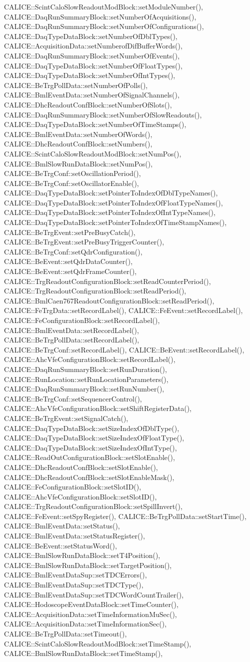 CALICE::ScintCaloSlowReadoutModBlock::setModuleNumber(), CALICE::DaqRunSummaryBlock::setNumberOfAcquisitions(), CALICE::DaqRunSummaryBlock::setNumberOfConfigurations(), CALICE::DaqTypeDataBlock::setNumberOfDblTypes(), CALICE::AcquisitionData::setNumberofDifBufferWords(), CALICE::DaqRunSummaryBlock::setNumberOfEvents(), CALICE::DaqTypeDataBlock::setNumberOfFloatTypes(), CALICE::DaqTypeDataBlock::setNumberOfIntTypes(), CALICE::BeTrgPollData::setNumberOfPolls(), CALICE::BmlEventData::setNumberOfSignalChannels(), CALICE::DhcReadoutConfBlock::setNumberOfSlots(), CALICE::DaqRunSummaryBlock::setNumberOfSlowReadouts(), CALICE::DaqTypeDataBlock::setNumberOfTimeStamps(), CALICE::BmlEventData::setNumberOfWords(), CALICE::DhcReadoutConfBlock::setNumbers(), CALICE::ScintCaloSlowReadoutModBlock::setNumPos(), CALICE::BmlSlowRunDataBlock::setNumPos(), CALICE::BeTrgConf::setOscillationPeriod(), CALICE::BeTrgConf::setOscillatorEnable(), CALICE::DaqTypeDataBlock::setPointerToIndexOfDblTypeNames(), CALICE::DaqTypeDataBlock::setPointerToIndexOfFloatTypeNames(), CALICE::DaqTypeDataBlock::setPointerToIndexOfIntTypeNames(), CALICE::DaqTypeDataBlock::setPointerToIndexOfTimeStampNames(), CALICE::BeTrgEvent::setPreBusyCatch(), CALICE::BeTrgEvent::setPreBusyTriggerCounter(), CALICE::BeTrgConf::setQdrConfiguration(), CALICE::BeEvent::setQdrDataCounter(), CALICE::BeEvent::setQdrFrameCounter(), CALICE::TrgReadoutConfigurationBlock::setReadCounterPeriod(), CALICE::TrgReadoutConfigurationBlock::setReadPeriod(), CALICE::BmlCaen767ReadoutConfigurationBlock::setReadPeriod(), CALICE::FeTrgData::setRecordLabel(), CALICE::FeEvent::setRecordLabel(), CALICE::FeConfigurationBlock::setRecordLabel(), CALICE::BmlEventData::setRecordLabel(), CALICE::BeTrgPollData::setRecordLabel(), CALICE::BeTrgConf::setRecordLabel(), CALICE::BeEvent::setRecordLabel(), CALICE::AhcVfeConfigurationBlock::setRecordLabel(), CALICE::DaqRunSummaryBlock::setRunDuration(), CALICE::RunLocation::setRunLocationParameters(), CALICE::DaqRunSummaryBlock::setRunNumber(), CALICE::BeTrgConf::setSequencerControl(), CALICE::AhcVfeConfigurationBlock::setShiftRegisterData(), CALICE::BeTrgEvent::setSignalCatch(), CALICE::DaqTypeDataBlock::setSizeIndexOfDblType(), CALICE::DaqTypeDataBlock::setSizeIndexOfFloatType(), CALICE::DaqTypeDataBlock::setSizeIndexOfIntType(), CALICE::ReadOutConfigurationBlock::setSlotEnable(), CALICE::DhcReadoutConfBlock::setSlotEnable(), CALICE::DhcReadoutConfBlock::setSlotEnableMask(), CALICE::FeConfigurationBlock::setSlotID(), CALICE::AhcVfeConfigurationBlock::setSlotID(), CALICE::TrgReadoutConfigurationBlock::setSpillInvert(), CALICE::FeEvent::setSpyRegister(), CALICE::BeTrgPollData::setStartTime(), CALICE::BmlEventData::setStatus(), CALICE::BmlEventData::setStatusRegister(), CALICE::BeEvent::setStatusWord(), CALICE::BmlSlowRunDataBlock::setT4Position(), CALICE::BmlSlowRunDataBlock::setTargetPosition(), CALICE::BmlEventDataSup::setTDCErrors(), CALICE::BmlEventDataSup::setTDCType(), CALICE::BmlEventDataSup::setTDCWordCountTrailer(), CALICE::HodoscopeEventDataBlock::setTimeCounter(), CALICE::AcquisitionData::setTimeInformationMuSec(), CALICE::AcquisitionData::setTimeInformationSec(), CALICE::BeTrgPollData::setTimeout(), CALICE::ScintCaloSlowReadoutModBlock::setTimeStamp(), CALICE::BmlSlowRunDataBlock::setTimeStamp(), 